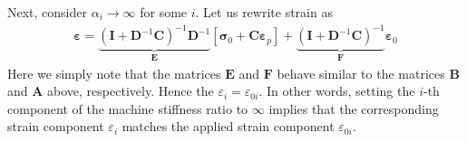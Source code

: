 Next, consider $\alpha_i\rightarrow\infty$ for some $i$. Let us rewrite strain as
\begin{align}
\bm \varepsilon=\underbrace{\left(\bm I+\bm D^{-1}\bm C\right)^{-1}\bm D^{-1}}_{\bm E} \left[\bm \sigma_0+\bm C\bm\varepsilon_p\right]
+\underbrace{\left(\bm I+\bm D^{-1}\bm C\right)^{-1}}_{\bm F} \bm \varepsilon_0
\end{align}
Here we simply note that the matrices $\bm E$ and $\bm F$ behave similar to the matrices $\bm B$ and $\bm A$ above, respectively. Hence the  $\varepsilon_{i}= \varepsilon_{0i}$. In other words, setting the $i$-th component of the machine stiffness ratio to $\infty$ implies that the corresponding strain component $\varepsilon_{i}$  matches the applied strain component $\varepsilon_{0i}$.





